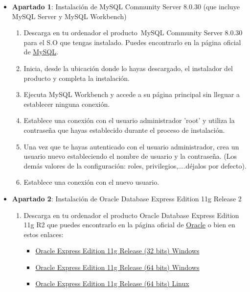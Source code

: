 \begin{itemize}
    \item \textbf{Apartado 1}: Instalación de MySQL Community Server 8.0.30 (que incluye MySQL Server y MySQL Workbench)
    \begin{enumerate}
        \item Descarga en tu ordenador el producto MySQL Community Server 8.0.30 para el S.O que tengas instalado. Puedes encontrarlo en la página oficial de \href{https://dev.mysql.com/downloads/mysql/}{MySQL}.
        \item Inicia, desde la ubicación donde lo hayas descargado, el instalador del producto y completa la instalación.
        \item Ejecuta MySQL Workbench  y accede a su página principal sin lleguar a establecer ninguna conexión.
        \item Establece una conexión con el usuario administrador 'root' y utiliza la contraseña que hayas establecido durante el proceso de instalación.
        \item Una vez que te hayas autenticado con el usuario administrador, crea un usuario nuevo estableciendo el nombre de usuario y la contraseña. (Los demás valores de la configuración: roles, privilegios,....déjalos por defecto).
        \item Establece una conexión con el nuevo usuario.
    \end{enumerate}
    \item \textbf{Apartado 2}: Instalación de Oracle Database Express Edition 11g Release 2
    \begin{enumerate}
        \item Descarga en tu ordenador el producto Oracle Database Express Edition 11g R2 que puedes encontrarlo en la página oficial de \href{https://www.oracle.com/database/technologies/xe-prior-release-downloads.html}{Oracle} o bien en estos enlaces:
        \begin{itemize}
            \item \href{https://www.filehorse.com/es/descargar-oracle-database-express/27799/}{Oracle Express Edition 11g Release (32 bits) Windows}
            \item \href{https://www.filehorse.com/es/descargar-oracle-database-express/27798/}{Oracle Express Edition 11g Release (64 bits) Windows}
            \item \href{https://www.tuinformaticafacil.com/descargas-gratis/bases-de-datos/herramientas-oracle/oracle-database-express-edition-11g-r2-para-linux-x64}{Oracle Express Edition 11g Release (64 bits) Linux}

\end{itemize}
\end{enumerate}
\end{itemize}

